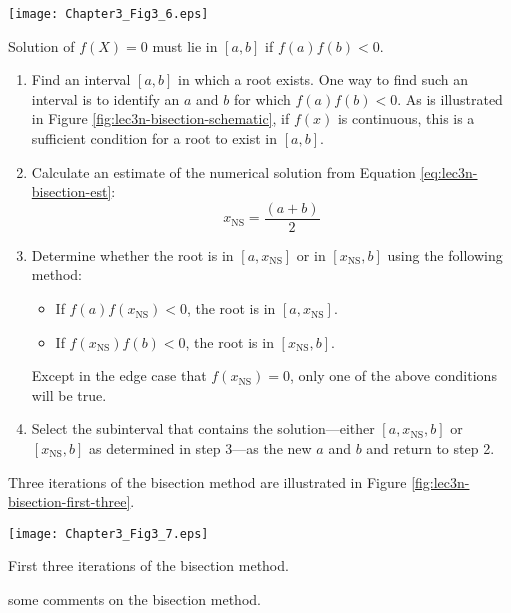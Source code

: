 \begin{marginfigure}
\texttt{[image: Chapter3\_Fig3\_6.eps]}
\caption{Solution of $f(X)=0$ must lie in $[a,b]$ if $f(a)f(b)<0$.}
\label{fig:lec3n-bisection-schematic}
\end{marginfigure}
\begin{enumerate}
\item Find an interval $[a,b]$ in which a root exists.  One way to find such an interval is to identify an $a$ and $b$ for which $f(a)f(b)<0$.  As is illustrated in Figure \ref{fig:lec3n-bisection-schematic}, if $f(x)$ is continuous, this is a sufficient condition for a root to exist in $[a,b]$.

\item Calculate an estimate of the numerical solution from Equation \ref{eq:lec3n-bisection-est}:
\begin{equation}
x_{\text{NS}} = \frac{(a+b)}{2}
\label{eq:lec3n-bisection-est}
\end{equation}

\item Determine whether the root is in $[a,x_{\text{NS}}]$ or in $[x_{\text{NS}},b]$ using the following method:
\begin{itemize}
\item If $f(a)f(x_{\text{NS}}) < 0$, the root is in $[a,x_{\text{NS}}]$.
\item If $f(x_{\text{NS}})f(b) < 0$, the root is in $[x_{\text{NS}},b]$.
\end{itemize}
Except in the edge case that $f(x_{\text{NS}})=0$, only one of the above conditions will be true.

\item Select the subinterval that contains the solution---either $[a,x_{\text{NS}},b]$ or $[x_{\text{NS}},b]$ as determined in step 3---as the new $a$ and $b$ and return to step 2.
\end{enumerate}
Three iterations of the bisection method are illustrated in Figure \ref{fig:lec3n-bisection-first-three}.
\begin{marginfigure}
\texttt{[image: Chapter3\_Fig3\_7.eps]}
\caption{First three iterations of the bisection method.}
\label{fig:lec3n-bisection-first-three}
\end{marginfigure}

 some comments on the bisection method.

